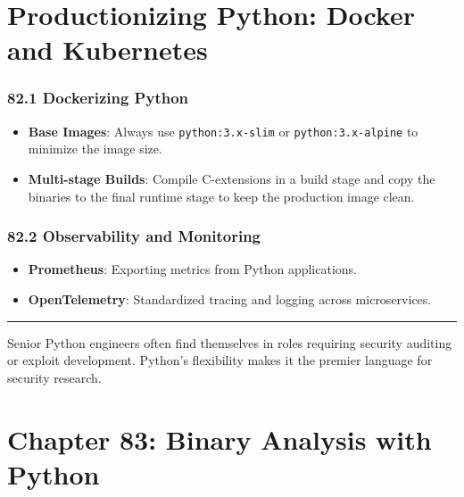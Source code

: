 \hypertarget{productionizing-python-docker-and-kubernetes}{%
\chapter{Productionizing Python: Docker and
Kubernetes}\label{productionizing-python-docker-and-kubernetes}}

\hypertarget{dockerizing-python}{%
\subsection{82.1 Dockerizing Python}\label{dockerizing-python}}

\begin{itemize}
\tightlist
\item
  \textbf{Base Images}: Always use
  \passthrough{\lstinline!python:3.x-slim!} or
  \passthrough{\lstinline!python:3.x-alpine!} to minimize the image
  size.
\item
  \textbf{Multi-stage Builds}: Compile C-extensions in a build stage and
  copy the binaries to the final runtime stage to keep the production
  image clean.
\end{itemize}

\hypertarget{observability-and-monitoring}{%
\subsection{82.2 Observability and
Monitoring}\label{observability-and-monitoring}}

\begin{itemize}
\tightlist
\item
  \textbf{Prometheus}: Exporting metrics from Python applications.
\item
  \textbf{OpenTelemetry}: Standardized tracing and logging across
  microservices.
\end{itemize}

\begin{center}\rule{0.5\linewidth}{0.5pt}\end{center}

Senior Python engineers often find themselves in roles requiring
security auditing or exploit development. Python's flexibility makes it
the premier language for security research.

\hypertarget{chapter-83-binary-analysis-with-python}{%
\chapter{Chapter 83: Binary Analysis with
Python}\label{chapter-83-binary-analysis-with-python}}


